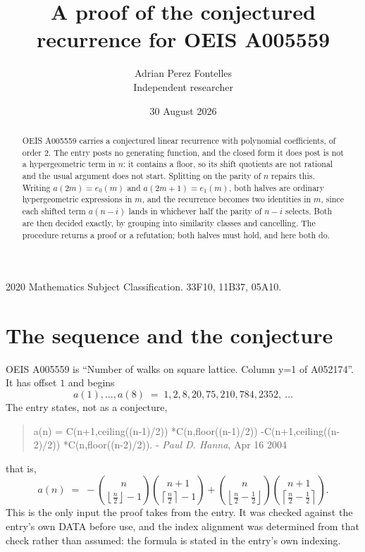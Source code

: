 \documentclass[11pt,a4paper]{article}
\title{A proof of the conjectured recurrence for OEIS A005559}
\author{Adrian Perez Fontelles\\ \small Independent researcher}
\date{30 August 2026}
\theoremstyle{plain}
\theoremstyle{definition}
\begin{document}
\maketitle

\begin{abstract}
OEIS A005559 carries a conjectured linear recurrence with polynomial coefficients, of
order 2. The entry posts no generating function, and the closed form it does post
is not a hypergeometric term in $n$: it contains a floor, so its shift quotients are not
rational and the usual argument does not start. Splitting on the parity of $n$ repairs
this. Writing $a(2m)=e_{0}(m)$ and $a(2m+1)=e_{1}(m)$, both halves are ordinary
hypergeometric expressions in $m$, and the recurrence becomes two identities in $m$, since
each shifted term $a(n-i)$ lands in whichever half the parity of $n-i$ selects. Both are
then decided exactly, by grouping into similarity classes and cancelling. The procedure
returns a proof or a refutation; both halves must hold, and here both do.
\end{abstract}

\noindent\small 2020 Mathematics Subject Classification. 33F10, 11B37, 05A10.\normalsize

\section{The sequence and the conjecture}

OEIS A005559 is ``Number of walks on square lattice. Column y=1 of A052174''. It has offset $1$ and begins
\[
a(1),\dots,a(8)\;=\;1, 2, 8, 20, 75, 210, 784, 2352,\ \dots
\]
The entry states, not as a conjecture,
\begin{quote}\small
a(n) = C(n+1,ceiling((n-1)/2)) *C(n,floor((n-1)/2)) -C(n+1,ceiling((n-2)/2)) *C(n,floor((n-2)/2)). - \emph{Paul D. Hanna}, Apr 16 2004
\end{quote}
that is,
\begin{equation}\label{eq:cf}
a(n)\;=\;- {\binom{n}{\left\lfloor{\frac{n}{2}}\right\rfloor - 1}} {\binom{n + 1}{\left\lceil{\frac{n}{2}}\right\rceil - 1}} + {\binom{n}{\left\lfloor{\frac{n}{2} - \frac{1}{2}}\right\rfloor}} {\binom{n + 1}{\left\lceil{\frac{n}{2} - \frac{1}{2}}\right\rceil}} .
\end{equation}
This is the only input the proof takes from the entry. It was checked against the entry's
own DATA before use, and the index alignment was determined from that check rather than
assumed: the formula is stated in the entry's own indexing.
\end{document}
